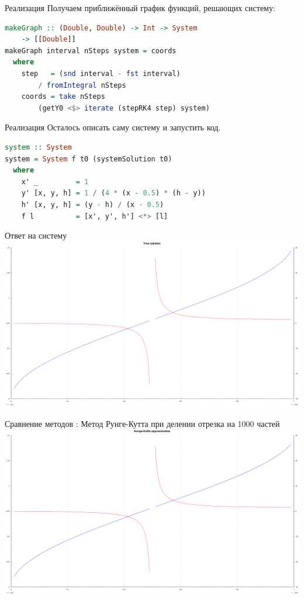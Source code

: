 \documentclass{beamer}
\begin{document}
\begin{frame}[fragile]{Реализация}
    Получаем приближённый график функций, решающих систему:
    \begin{lstlisting}[language=Haskell]
makeGraph :: (Double, Double) -> Int -> System
    -> [[Double]]
makeGraph interval nSteps system = coords
  where
    step   = (snd interval - fst interval)
        / fromIntegral nSteps
    coords = take nSteps
        (getY0 <$> iterate (stepRK4 step) system)
    \end{lstlisting}
\end{frame}

\begin{frame}[fragile]{Реализация}
    Осталось описать саму систему и запустить код.
    \begin{lstlisting}[language=Haskell]
system :: System
system = System f t0 (systemSolution t0)
  where
    x' _         = 1
    y' [x, y, h] = 1 / (4 * (x - 0.5) * (h - y))
    h' [x, y, h] = (y - h) / (x - 0.5)
    f l          = [x', y', h'] <*> [l]
    \end{lstlisting}
\end{frame}

\begin{frame}{Ответ на систему}
    \includegraphics[width=\textwidth]{solution}
\end{frame}

\begin{frame}{Сравнение методов : Метод Рунге-Кутта при делении отрезка на 1000 частей}
    \includegraphics[width=\textwidth]{runge1000}
\end{frame}
\end{document}
